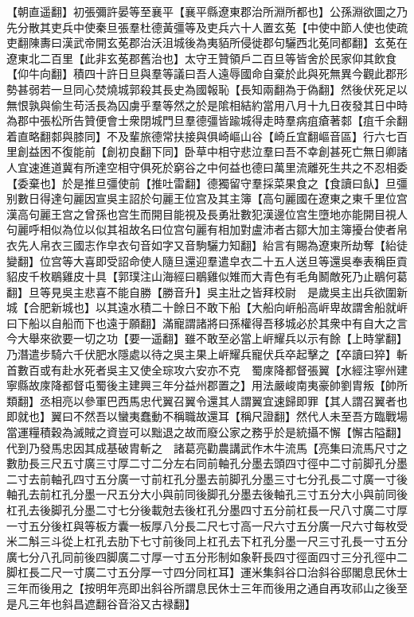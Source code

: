【朝直遥翻】初張彌許晏等至襄平【襄平縣遼東郡治所淵所都也】公孫淵欲圖之乃先分散其吏兵中使秦旦張羣杜德黃彊等及吏兵六十人置玄莬【中使中節人使也使疏吏翻陳夀曰漢武帝開玄莬郡治沃沮城後為夷貊所侵徙郡句驪西北莬同都翻】玄莬在遼東北二百里【此非玄莬郡舊治也】太守王贊領戶二百旦等皆舍於民家仰其飲食【仰牛向翻】積四十許日旦與羣等議曰吾人遠辱國命自棄於此與死無異今觀此郡形勢甚弱若一旦同心焚燒城郭殺其長史為國報恥【長知兩翻為于偽翻】然後伏死足以無恨孰與偷生苟活長為囚虜乎羣等然之於是隂相結約當用八月十九日夜發其日中時為郡中張松所告贊便會士衆閉城門旦羣德彊皆踰城得走時羣病疽瘡著䣛【疽千余翻着直略翻䣛與膝同】不及輩旅德常扶接與俱崎嶇山谷【崎丘宜翻嶇音區】行六七百里創益困不復能前【創初良翻下同】卧草中相守悲泣羣曰吾不幸創甚死亡無日卿諸人宜速進道冀有所達空相守俱死於窮谷之中何益也德曰萬里流離死生共之不忍相委【委棄也】於是推旦彊使前【推吐雷翻】德獨留守羣採菜果食之【食讀曰飤】旦彊别數日得達句麗因宣吳主詔於句麗王位宫及其主簿【高句麗國在遼東之東千里位宫漢高句麗王宫之曾孫也宫生而開目能視及長勇壯數犯漢邊位宫生墮地亦能開目視人句麗呼相似為位以似其祖故名曰位宫句麗有相加對盧沛者古鄒大加主簿擾台使者帛衣先人帛衣三國志作皁衣句音如字又音駒驪力知翻】紿言有賜為遼東所劫奪【紿徒變翻】位宫等大喜即受詔命使人隨旦還迎羣遣皁衣二十五人送旦等還吳奉表稱臣貢貂皮千枚鶡雞皮十具【郭璞注山海經曰鶡雞似雉而大青色有毛角鬭敵死乃止鶡何葛翻】旦等見吳主悲喜不能自勝【勝音升】吳主壯之皆拜校尉　是歲吳主出兵欲圍新城【合肥新城也】以其遠水積二十餘日不敢下船【大船向㟁船高㟁卑故謂舍船就㟁曰下船以自船而下也遠于願翻】滿寵謂諸將曰孫權得吾移城必於其衆中有自大之言今大舉來欲要一切之功【要一遥翻】雖不敢至必當上㟁耀兵以示有餘【上時掌翻】乃潛遣步騎六千伏肥水隱處以待之吳主果上㟁耀兵寵伏兵卒起擊之【卒讀曰猝】斬首數百或有赴水死者吳主又使全琮攻六安亦不克　蜀庲降都督張翼【水經注寧州建寧縣故庲降都督屯蜀後主建興三年分益州郡置之】用法嚴峻南夷豪帥劉胄叛【帥所類翻】丞相亮以參軍巴西馬忠代翼召翼令還其人謂翼宜速歸即罪【其人謂召翼者也即就也】翼曰不然吾以蠻夷蠢動不稱職故還耳【稱尺證翻】然代人未至吾方臨戰場當運糧積穀為滅賊之資豈可以黜退之故而廢公家之務乎於是統攝不懈【懈古隘翻】代到乃發馬忠因其成基破胄斬之　諸葛亮勸農講武作木牛流馬【亮集曰流馬尺寸之數肋長三尺五寸廣三寸厚二寸二分左右同前軸孔分墨去頭四寸徑中二寸前脚孔分墨二寸去前軸孔四寸五分廣一寸前杠孔分墨去前脚孔分墨三寸七分孔長二寸廣一寸後軸孔去前杠孔分墨一尺五分大小與前同後脚孔分墨去後軸孔三寸五分大小與前同後杠孔去後脚孔分墨二寸七分後載尅去後杠孔分墨四寸五分前杠長一尺八寸廣二寸厚一寸五分後杠與等板方囊一板厚八分長二尺七寸高一尺六寸五分廣一尺六寸每枚受米二斛三斗從上杠孔去肋下七寸前後同上杠孔去下杠孔分墨一尺三寸孔長一寸五分廣七分八孔同前後四脚廣二寸厚一寸五分形制如象靬長四寸徑面四寸三分孔徑中二脚杠長二尺一寸廣二寸五分厚一寸四分同杠耳】運米集斜谷口治斜谷邸閣息民休士三年而後用之【按明年亮即出斜谷所謂息民休士三年而後用之通自再攻祁山之後至是凡三年也斜昌遮翻谷音浴又古禄翻】

